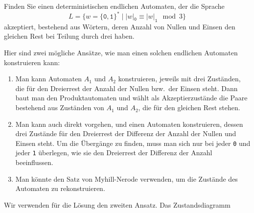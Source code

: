 Finden Sie einen deterministischen endlichen Automaten, der
die Sprache
\[
L
=
\{
w = \{\texttt{0},\texttt{1}\}^*
\;|\;
|w|_{\texttt{0}}
\equiv
|w|_{\texttt{1}}
\mod 3
\}
\]
akzeptiert,
bestehend aus Wörtern, deren Anzahl von Nullen und Einsen den 
gleichen Rest bei Teilung durch drei haben.


\begin{loesung}
Hier sind zwei mögliche Ansätze, wie man einen solchen endlichen
Automaten konstruieren kann:
\begin{enumerate}
\item
Man kann Automaten $A_1$ und $A_2$ konstruieren, jeweils mit drei Zuständen,
die für den Dreierrest der Anzahl der Nullen bzw.~der Einsen steht.
Dann baut man den Produktautomaten und wählt als Akzeptierzustände
die Paare bestehend aus Zuständen von $A_1$ und $A_2$, die für den gleichen
Rest stehen.
\item
Man kann auch direkt vorgehen, und einen Automaten konstruieren,
dessen drei Zustände für den Dreierrest der Differenz der Anzahl der
Nullen und Einsen steht.
Um die Übergänge zu finden, muss man sich nur bei jeder \texttt{0} und
jeder \texttt{1} überlegen, wie sie den Dreierrest der Differenz der
Anzahl beeinflussen.
\item
Man könnte den Satz von Myhill-Nerode verwenden, um die Zustände des
Automaten zu rekonstruieren.
\end{enumerate}
Wir verwenden für die Lösung den zweiten Ansatz.
Das Zustandsdiagramm 
\begin{center}
\end{center}
\end{loesung}
